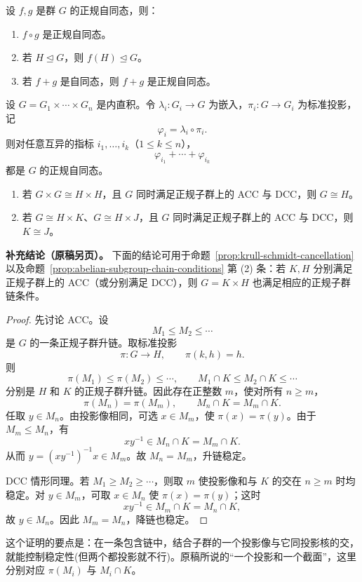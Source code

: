 \begin{proposition}\label{prop:normal-endomorphism-properties}
设 $f,g$ 是群 $G$ 的正规自同态，则：
\begin{enumerate}[label=(\arabic*)]
  \item $f\circ g$ 是正规自同态。
  \item 若 $H\trianglelefteq G$，则 $f(H)\trianglelefteq G$。
  \item 若 $f+g$ 是自同态，则 $f+g$ 是正规自同态。
\end{enumerate}
\end{proposition}

\begin{proposition}\label{prop:direct-product-normal-projections}
设 $G=G_1\times\cdots\times G_n$ 是内直积。令 $\lambda_i:G_i\to G$ 为嵌入，$\pi_i:G\to G_i$ 为标准投影，记
\[
  \varphi_i=\lambda_i\circ\pi_i.
\]
则对任意互异的指标 $i_1,\ldots,i_k$（$1\leq k\leq n$），
\[
  \varphi_{i_1}+\cdots+\varphi_{i_k}
\]
都是 $G$ 的正规自同态。
\end{proposition}

\begin{proposition}\label{prop:krull-schmidt-cancellation}
\begin{enumerate}[label=(\arabic*)]
  \item 若 $G\times G\cong H\times H$，且 $G$ 同时满足正规子群上的 ACC 与 DCC，则 $G\cong H$。
  \item 若 $G\cong H\times K$、$G\cong H\times J$，且 $G$ 同时满足正规子群上的 ACC 与 DCC，则 $K\cong J$。
\end{enumerate}
\end{proposition}

\par\textbf{补充结论（原稿另页）。}
下面的结论可用于命题~\ref{prop:krull-schmidt-cancellation}
以及命题~\ref{prop:abelian-subgroup-chain-conditions} 第 (2) 条：若 $K,H$ 分别满足正规子群上的 ACC（或分别满足 DCC），则 $G=K\times H$ 也满足相应的正规子群链条件。

\begin{proof}
先讨论 ACC。设
\[
  M_1\leq M_2\leq\cdots
\]
是 $G$ 的一条正规子群升链。取标准投影
\[
  \pi:G\longrightarrow H,\qquad \pi(k,h)=h.
\]
则
\[
  \pi(M_1)\leq\pi(M_2)\leq\cdots,\qquad
  M_1\cap K\leq M_2\cap K\leq\cdots
\]
分别是 $H$ 和 $K$ 的正规子群升链。因此存在正整数 $m$，使对所有 $n\geq m$，
\[
  \pi(M_n)=\pi(M_m),\qquad M_n\cap K=M_m\cap K.
\]
任取 $y\in M_n$。由投影像相同，可选 $x\in M_m$，使 $\pi(x)=\pi(y)$。由于 $M_m\leq M_n$，有
\[
  xy^{-1}\in M_n\cap K=M_m\cap K.
\]
从而 $y=(xy^{-1})^{-1}x\in M_m$。故 $M_n=M_m$，升链稳定。

DCC 情形同理。若 $M_1\geq M_2\geq\cdots$，则取 $m$ 使投影像和与 $K$ 的交在 $n\geq m$ 时均稳定。对 $y\in M_m$，可取 $x\in M_n$ 使 $\pi(x)=\pi(y)$；这时
\[
  xy^{-1}\in M_m\cap K=M_n\cap K,
\]
故 $y\in M_n$。因此 $M_m=M_n$，降链也稳定。
\end{proof}

\begin{purplenote}
这个证明的要点是：在一条包含链中，结合子群的一个投影像与它同投影核的交，就能控制稳定性(但两个都投影就不行)。原稿所说的“一个投影和一个截面”，这里分别对应 $\pi(M_i)$ 与 $M_i\cap K$。
\end{purplenote}


